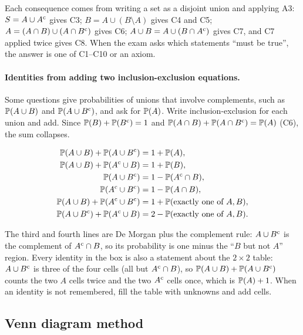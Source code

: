Each consequence comes from writing a set as a disjoint union and applying A3:
$S = A \cup A^{\mathrm{c}}$ gives C3; $B = A \cup (B \setminus A)$ gives C4 and C5;
$A = (A\cap B) \cup (A\cap B^{\mathrm{c}})$ gives C6; $A \cup B = A \cup (B \cap A^{\mathrm{c}})$
gives C7, and C7 applied twice gives C8. When the exam asks which statements
``must be true'', the answer is one of C1--C10 or an axiom.

\paragraph{Identities from adding two inclusion-exclusion equations.}
Some questions give probabilities of unions that involve complements, such as
$\mathbb{P}(A \cup B)$ and $\mathbb{P}(A \cup B^{\mathrm{c}})$, and ask for $\mathbb{P}(A)$. Write
inclusion-exclusion for each union and add. Since $\mathbb{P}(B) + \mathbb{P}(B^{\mathrm{c}}) = 1$ and
$\mathbb{P}(A\cap B) + \mathbb{P}(A \cap B^{\mathrm{c}}) = \mathbb{P}(A)$ (C6), the sum collapses.

\begin{keyfact}
\begin{align*}
  \mathbb{P}(A \cup B) + \mathbb{P}(A \cup B^{\mathrm{c}}) &= 1 + \mathbb{P}(A), \\
  \mathbb{P}(A \cup B) + \mathbb{P}(A^{\mathrm{c}} \cup B) &= 1 + \mathbb{P}(B), \\
  \mathbb{P}(A \cup B^{\mathrm{c}}) &= 1 - \mathbb{P}(A^{\mathrm{c}} \cap B), \\
  \mathbb{P}(A^{\mathrm{c}} \cup B^{\mathrm{c}}) &= 1 - \mathbb{P}(A \cap B), \\
  \mathbb{P}(A \cup B) + \mathbb{P}(A^{\mathrm{c}} \cup B^{\mathrm{c}}) &= 1 + \mathbb{P}(\text{exactly one of } A, B), \\
  \mathbb{P}(A \cup B^{\mathrm{c}}) + \mathbb{P}(A^{\mathrm{c}} \cup B) &= 2 - \mathbb{P}(\text{exactly one of } A, B).
\end{align*}
\end{keyfact}

The third and fourth lines are De Morgan plus the complement rule: $A \cup B^{\mathrm{c}}$
is the complement of $A^{\mathrm{c}} \cap B$, so its probability is one minus the
``$B$ but not $A$'' region. Every identity in the box is also a statement about the
$2\times 2$ table: $A \cup B^{\mathrm{c}}$ is three of the four cells (all but
$A^{\mathrm{c}}\cap B$), so $\mathbb{P}(A \cup B) + \mathbb{P}(A \cup B^{\mathrm{c}})$ counts the two $A$ cells
twice and the two $A^{\mathrm{c}}$ cells once, which is $\mathbb{P}(A) + 1$. When an identity is not
remembered, fill the table with unknowns and add cells.

\subsection{Venn diagram method}

